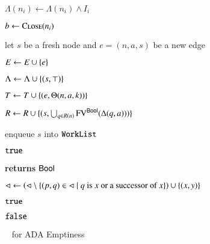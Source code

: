 \documentclass[10pt,conference,letterpaper,twocolumn]{IEEEtran}
\begin{document}
\begin{algorithm}[t!]
{\begin{algorithmic}[1]
  \State $\Lambda(n_i) \leftarrow \Lambda(n_i) \wedge I_i$


  \State $b \leftarrow \Call{Close}{n_i}$
  \label{ln:refine-end}

  \EndIf %

  \EndIf %

  \EndFor 

  \EndIf %


  \label{ln:expand-begin}

  \State let $s$ be a fresh node and $e = (n,a,s)$ be a new edge

  \State $E \leftarrow E \cup \left\{ e \right\}$
  \label{ln:edge-insert}

  \State $\Lambda \leftarrow \Lambda \cup \left\{ (s,\top) \right\}$

  \State $T \leftarrow T \cup \left\{ (e, \Theta(n,a,k)) \right\}$

  \State $R \leftarrow R \cup \{(s,\bigcup_{q \in R(n)}\mathrm{FV}^{\mathsf{Bool}}(\Delta(q,a)))\}$

  \State enqueue $s$ into $\mathtt{WorkList}$
  \label{ln:expand-end}

  \EndFor

  \EndIf %

  \EndWhile  

   $\mathtt{true}$
\end{algorithmic}

\begin{algorithmic}[1]
 {\bf returns} $\mathsf{Bool}$



\State $\lhd \leftarrow \left(\lhd \setminus \left\{  (p,q) \in \lhd \mid
  \text{$q$ is $x$ or a successor of $x$} \right\}\right) \cup \left\{ (x,y) \right\}$
\label{ln:close-uncover}

 $\mathtt{true}$ 

\EndIf

\EndFor

 $\mathtt{false}$

\EndFunction
\end{algorithmic}}
\caption{\impact~ for ADA Emptiness}
\label{alg:impact}
\end{algorithm}
\end{document}
